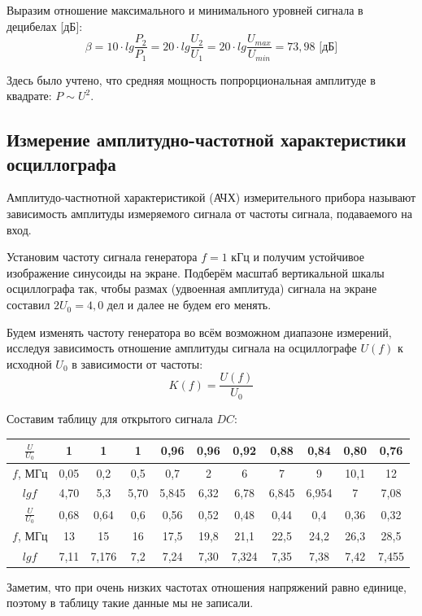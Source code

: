 \documentclass[a4paper, 12pt]{article} %
\begin{document}
Выразим отношение максимального и минимального уровней сигнала в децибелах [дБ]:
\[\beta = 10 \cdot lg \frac{P_2}{P_1} = 20 \cdot lg \frac{U_2}{U_1} = 20 \cdot lg \frac{U_{max}}{U_{min}} = 73,98 \text{ [дБ]}\]

Здесь было учтено, что средняя мощность попрорциональная амплитуде в квадрате: $P\sim U^2$.

\subsection{Измерение амплитудно-частотной характеристики осциллографа}

Амплитудо-частнотной характеристикой (АЧХ) измерительного прибора называют зависимость амплитуды измеряемого
сигнала от частоты сигнала, подаваемого на вход.

Установим частоту сигнала генератора $f = 1$ кГц и получим
устойчивое изображение синусоиды на экране. Подберём масштаб вертикальной шкалы осциллографа так, чтобы размах (удвоенная амплитуда) сигнала на
экране составил $2U_0 = 4,0$ дел и далее не будем его менять.

Будем изменять частоту генератора во всём возможном диапазоне измерений, исследуя зависимость отношение амплитуды сигнала на осциллографе $U(f)$ к исходной $U_0$ в зависимости от частоты:
\[K(f) = \frac{U(f)}{U_0}\]
 
Составим таблицу для открытого сигнала $DC$:
\begin{center}
\begin{tabular}{|c|c|c|c|c|c|c|c|c|c|c|}
 \hline 
 $\frac{U}{U_0}$ & 1 & 1 & 1 & 0,96 & 0,96 & 0,92 & 0,88 & 0,84 & 0,80 & 0,76 \\ 
 \hline 
 $f$, МГц & 0,05 & 0,2 & 0,5 & 0,7 & 2 & 6 & 7 & 9 & 10,1 & 12 \\
 \hline 
 $lgf$ & 4,70 & 5,3 & 5,70 & 5,845 & 6,32 & 6,78 & 6,845 & 6,954 & 7 & 7,08 \\  
 \hline 
 $\frac{U}{U_0}$ & 0,68 & 0,64 & 0,6 & 0,56 & 0,52 & 0,48 & 0,44 & 0,4 & 0,36 & 0,32 \\ 
 \hline 
 $f$, МГц & 13 & 15 & 16 & 17,5 & 19,8 & 21,1 & 22,5 & 24,2 & 26,3 & 28,5 \\ 
 \hline
 $lgf$ & 7,11 & 7,176 & 7,2 & 7,24 & 7,30 & 7,324 & 7,35 & 7,38 & 7,42 & 7,455 \\  
 \hline  
 \end{tabular}
 \end{center}
  
Заметим, что при очень низких частотах отношения напряжений равно единице, поэтому в таблицу такие данные мы не записали. 
\end{document}
